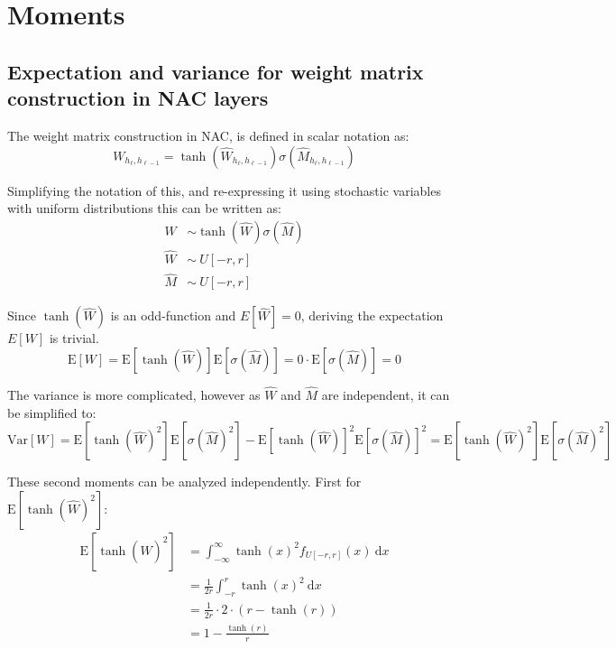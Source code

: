 \section{Moments}

\subsection{Expectation and variance for weight matrix construction in NAC layers}

The weight matrix construction in NAC, is defined in scalar notation as: 
\begin{equation}
W_{h_\ell, h_{\ell-1}} = \tanh(\hat{W}_{h_\ell, h_{\ell-1}}) \sigma(\hat{M}_{h_\ell, h_{\ell-1}})
\end{equation}

Simplifying the notation of this, and re-expressing it using stochastic variables with uniform distributions this can be written as:
\begin{equation}
\begin{aligned}
W &\sim \tanh(\hat{W}) \sigma(\hat{M}) \\
\hat{W} &\sim ~ U[-r, r] \\
\hat{M} &\sim ~ U[-r, r] 
\end{aligned}
\end{equation}

Since $\tanh({\hat{W}})$ is an odd-function and $E[\hat{W}] = 0$, deriving the expectation $E[W]$ is trivial.
\begin{equation}
\mathrm{E}[W] = \mathrm{E}[\tanh(\hat{W})]\mathrm{E}[\sigma(\hat{M})] = 0 \cdot \mathrm{E}[\sigma(\hat{M})] = 0
\end{equation}

The variance is more complicated, however as $\hat{W}$ and $\hat{M}$ are independent, it can be simplified to:
\begin{equation}
\mathrm{Var}[W] = \mathrm{E}[\tanh(\hat{W})^2] \mathrm{E}[\sigma(\hat{M})^2] - \mathrm{E}[\tanh(\hat{W})]^2 \mathrm{E}[\sigma(\hat{M})]^2 = \mathrm{E}[\tanh(\hat{W})^2] \mathrm{E}[\sigma(\hat{M})^2]
\end{equation}

These second moments can be analyzed independently. First for $\mathrm{E}[\tanh(\hat{W})^2]$:
\begin{equation}
\begin{aligned}
\mathrm{E}[\tanh(\hat{W})^2] &= \int_{-\infty}^{\infty} \tanh(x)^2 f_{U[-r, r]}(x)\ \mathrm{d}x \\
&= \frac{1}{2r} \int_{-r}^{r} \tanh(x)^2\ \mathrm{d}x \\
&= \frac{1}{2r} \cdot 2 \cdot (r - \tanh(r)) \\
&= 1 - \frac{\tanh(r)}{r}
\end{aligned}
\end{equation}

